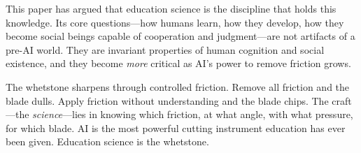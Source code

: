 \documentclass[12pt]{article}
\begin{document}
This paper has argued that education science is the discipline that holds this knowledge. Its core questions---how humans learn, how they develop, how they become social beings capable of cooperation and judgment---are not artifacts of a pre-AI world. They are invariant properties of human cognition and social existence, and they become \emph{more} critical as AI's power to remove friction grows.

The whetstone sharpens through controlled friction. Remove all friction and the blade dulls. Apply friction without understanding and the blade chips. The craft---the \emph{science}---lies in knowing which friction, at what angle, with what pressure, for which blade. AI is the most powerful cutting instrument education has ever been given. Education science is the whetstone.



\end{document}
